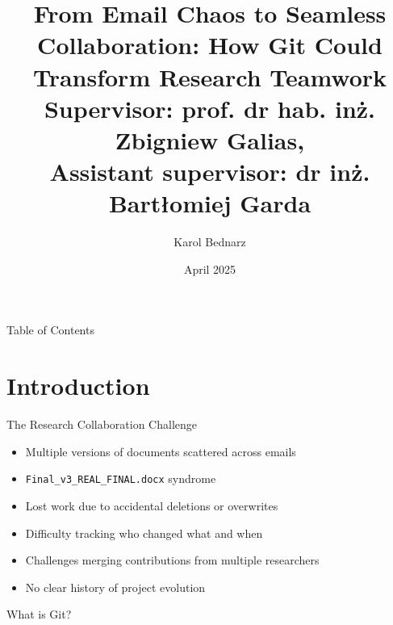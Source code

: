 \documentclass[aspectratio=1609]{beamer}
\title{ From Email Chaos to Seamless Collaboration: How Git Could Transform Research Teamwork\\
\small Supervisor: prof. dr hab. inż. Zbigniew Galias, \\
Assistant supervisor: dr inż. Bartłomiej Garda
}
\date{April 2025}
\author{Karol Bednarz}
\begin{document}
\begin{frame}
\titlepage
\end{frame}

\begin{frame}{Table of Contents}
    \tableofcontents
\end{frame}

\section{Introduction}
\begin{frame}[fragile]{The Research Collaboration Challenge}
    \begin{tblock}{}
        \begin{itemize}
            \item Multiple versions of documents scattered across emails
            \item \verb|Final_v3_REAL_FINAL.docx| syndrome
            \item Lost work due to accidental deletions or overwrites
            \item Difficulty tracking who changed what and when
            \item Challenges merging contributions from multiple researchers
            \item No clear history of project evolution
        \end{itemize}
    \end{tblock}
\end{frame}

\begin{frame}{What is Git?}
    
\end{frame}

\end{document}
